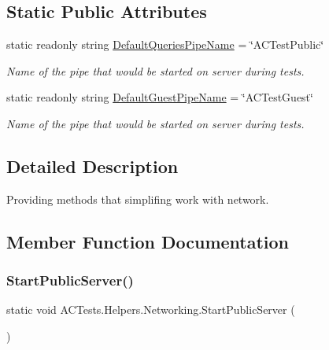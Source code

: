 \subsection*{Static Public Attributes}
\begin{DoxyCompactItemize}
\item 
static readonly string \mbox{\hyperlink{class_a_c_tests_1_1_helpers_1_1_networking_a0b045b1439744a08d2c9fd8f78988007}{Default\+Queries\+Pipe\+Name}} = \char`\"{}A\+C\+Test\+Public\char`\"{}
\begin{DoxyCompactList}\small\item\em Name of the pipe that would be started on server during tests. \end{DoxyCompactList}\item 
static readonly string \mbox{\hyperlink{class_a_c_tests_1_1_helpers_1_1_networking_a93b4700cffc19dd3ca204e1fa3890028}{Default\+Guest\+Pipe\+Name}} = \char`\"{}A\+C\+Test\+Guest\char`\"{}
\begin{DoxyCompactList}\small\item\em Name of the pipe that would be started on server during tests. \end{DoxyCompactList}\end{DoxyCompactItemize}


\subsection{Detailed Description}
Providing methods that simplifing work with network. 



\subsection{Member Function Documentation}
\mbox{\label{class_a_c_tests_1_1_helpers_1_1_networking_ae283b8d84a389c850f793012a5026c98}} 
\subsubsection{\texorpdfstring{Start\+Public\+Server()}{StartPublicServer()}\hspace{0.1cm}{\footnotesize\ttfamily [1/3]}}
{\footnotesize\ttfamily static void A\+C\+Tests.\+Helpers.\+Networking.\+Start\+Public\+Server (\begin{DoxyParamCaption}{ }\end{DoxyParamCaption})\hspace{0.3cm}{\ttfamily [static]}}



